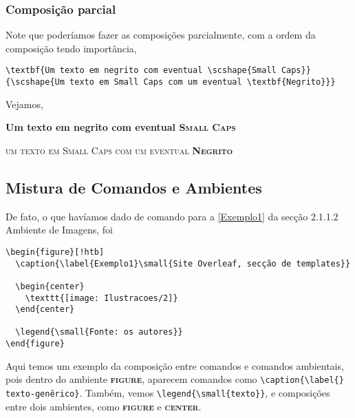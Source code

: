 \documentclass[12pt, brazilian, a5paper]{abntex2} %
\newlength\mystoreparindent
\newenvironment{myparindent}[1]{%
  \setlength{\mystoreparindent}{\the\parindent}
  \setlength{\parindent}{#1}
}{%
  \setlength{\parindent}{\mystoreparindent}
}
\begin{document}
\begin{myparindent}{0pt}
  \vspace{0.3cm}

  \subsubsection{Composição parcial}
  Note que poderíamos fazer as composições parcialmente, com a ordem da
  composição tendo importância,
\begin{verbatim}
\textbf{Um texto em negrito com eventual \scshape{Small Caps}}
{\scshape{Um texto em Small Caps com um eventual \textbf{Negrito}}}
\end{verbatim}

  Vejamos,

  \textbf{Um texto em negrito com eventual \scshape{Small Caps}}

  {\scshape{um texto em Small Caps com um eventual \textbf{Negrito}}}
\end{myparindent}
\clearpage
\subsection{Mistura de Comandos e Ambientes}
\begin{myparindent}{0pt}


  De fato, o que havíamos dado de comando para a \autoref{Exemplo1} da
  secção 2.1.1.2 Ambiente de Imagens, foi

\begin{verbatim}
\begin{figure}[!htb]
  \caption{\label{Exemplo1}\small{Site Overleaf, secção de templates}}

  \begin{center}
    \texttt{[image: Ilustracoes/2]}
  \end{center}

  \legend{\small{Fonte: os autores}}
\end{figure}
\end{verbatim}

  Aqui temos um exemplo da composição entre comandos e comandos
  ambientais, pois dentro do ambiente \textbf{{\scshape{figure}}}, aparecem comandos
  como \small{\verb+\caption{\label{} texto-genêrico}+}. Também, vemos
  \small{\verb+\legend{\small{texto}}+}, e composições entre dois
  ambientes, como \textbf{{\scshape{figure}}} e
  \textbf{{\scshape{center}}}.

\end{myparindent}
\vspace{1cm}
\end{document}
